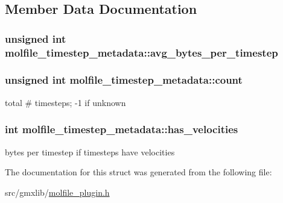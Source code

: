 \subsection{\-Member \-Data \-Documentation}
\hypertarget{structmolfile__timestep__metadata_a0ea761e7a9a1a413f1766b6912b91bd3}{
\subsubsection[{avg\-\_\-bytes\-\_\-per\-\_\-timestep}]{\setlength{\rightskip}{0pt plus 5cm}unsigned int {\bf molfile\-\_\-timestep\-\_\-metadata\-::avg\-\_\-bytes\-\_\-per\-\_\-timestep}}}\label{structmolfile__timestep__metadata_a0ea761e7a9a1a413f1766b6912b91bd3}
\hypertarget{structmolfile__timestep__metadata_af27ad1cef24c4ec748242067755c0814}{
\subsubsection[{count}]{\setlength{\rightskip}{0pt plus 5cm}unsigned int {\bf molfile\-\_\-timestep\-\_\-metadata\-::count}}}\label{structmolfile__timestep__metadata_af27ad1cef24c4ec748242067755c0814}
total \# timesteps; -\/1 if unknown \hypertarget{structmolfile__timestep__metadata_ad014d9264b7010ba7e34a0b7488c7463}{
\subsubsection[{has\-\_\-velocities}]{\setlength{\rightskip}{0pt plus 5cm}int {\bf molfile\-\_\-timestep\-\_\-metadata\-::has\-\_\-velocities}}}\label{structmolfile__timestep__metadata_ad014d9264b7010ba7e34a0b7488c7463}
bytes per timestep if timesteps have velocities 

\-The documentation for this struct was generated from the following file\-:\begin{DoxyCompactItemize}
\item 
src/gmxlib/\hyperlink{molfile__plugin_8h}{molfile\-\_\-plugin.\-h}\end{DoxyCompactItemize}

